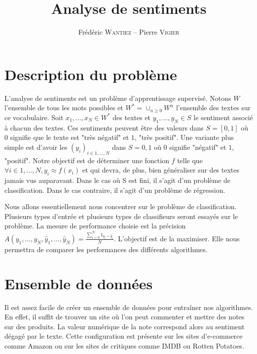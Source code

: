 \documentclass{article}
\title{Analyse de sentiments}
\author{Frédéric \textsc{Wantiez} -- Pierre \textsc{Vigier}}
\begin{document}
\maketitle

\section{Description du problème}

L'analyse de sentiments est un problème d'apprentissage supervisé. Notons $W$ l'ensemble de tous les mots possibles et $W^{*}=\cup_{n \geq 0}{W^{n}}$ l'ensemble des textes sur ce vocabulaire. Soit $x_{1}, ..., x_{N} \in W^{*}$ des textes et $y_{1}, ..., y_{N} \in S$ le sentiment associé à chacun des textes. Ces sentiments peuvent être des valeurs dans $S=[0, 1]$ où $0$ signifie que le texte est "très négatif" et $1$, "très positif". Une variante plus simple est d'avoir les $(y_{i})_{i \in {1, ..., N}}$ dans $S={0, 1}$ où 0 signifie "négatif" et $1$, "positif". Notre objectif est de déterminer une fonction $f$ telle que $\forall i \in {1, ..., N}, y_{i} \approx f(x_{i})$ et qui devra, de plus, bien généraliser sur des textes jamais vus auparavant. Dans le cas où S est fini, il s'agit d'un problème de classification. Dans le cas contraire, il s'agit d'un problème de régression.

Nous allons essentiellement nous concentrer sur le problème de classification. Plusieurs types d'entrée et plusieurs types de classifieurs seront essayés sur le problème. La mesure de performance choisie est la précision $A(y_{1}, ..., y_{N}, \hat{y}_{1}, ..., \hat{y}_{N}) = \frac{\sum_{i=0}^{N}{1_{y_{i}=\hat{y}_{i}}}}{N}$. L'objectif est de la maximiser. Elle nous permettra de comparer les performances des différents algorithmes.


\section{Ensemble de données}

Il est assez facile de créer un ensemble de données pour entraîner nos algorithmes. En effet, il suffit de trouver un site où l'on peut commenter et mettre des notes sur des produits. La valeur numérique de la note correspond alors au sentiment dégagé par le texte. Cette configuration est présente sur les sites d'e-commerce comme Amazon ou sur les sites de critiques comme IMDB ou Rotten Potatoes.
\end{document}
